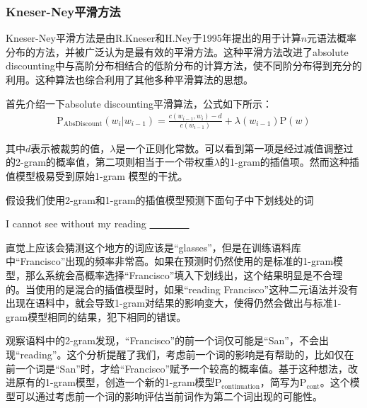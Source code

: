 
\subsubsection{Kneser-Ney平滑方法}

\parinterval Kneser-Ney平滑方法是由R.Kneser和H.Ney于1995年提出的用于计算$n$元语法概率分布的方法\cite{kneser1995improved}\cite{chen1999empirical}，并被广泛认为是最有效的平滑方法。这种平滑方法改进了absolute discounting中与高阶分布相结合的低阶分布的计算方法，使不同阶分布得到充分的利用。这种算法也综合利用了其他多种平滑算法的思想。

\parinterval 首先介绍一下absolute discounting平滑算法，公式如下所示：
\begin{eqnarray}
\textrm{P}_{\textrm{AbsDiscount}}(w_i | w_{i-1}) = \frac{c(w_{i-1},w_i )-d}{c(w_{i-1})} + \lambda(w_{i-1})\textrm{P}(w)
\label{eq:2-33}
\end{eqnarray}

\noindent 其中$d$表示被裁剪的值，$\lambda$是一个正则化常数。可以看到第一项是经过减值调整过的2-gram的概率值，第二项则相当于一个带权重$\lambda$的1-gram的插值项。然而这种插值模型极易受到原始1-gram 模型的干扰。

\parinterval 假设我们使用2-gram和1-gram的插值模型预测下面句子中下划线处的词

\vspace{0.0em}
\begin{center}
I cannot see without my reading \underline{\ \ \ \ \ \ \ \ }
\end{center}
\vspace{0.0em}

\noindent 直觉上应该会猜测这个地方的词应该是``glasses''，但是在训练语料库中``Francisco''出现的频率非常高。如果在预测时仍然使用的是标准的1-gram模型，那么系统会高概率选择``Francisco''填入下划线出，这个结果明显是不合理的。当使用的是混合的插值模型时，如果``reading Francisco''这种二元语法并没有出现在语料中，就会导致1-gram对结果的影响变大，使得仍然会做出与标准1-gram模型相同的结果，犯下相同的错误。

\parinterval 观察语料中的2-gram发现，``Francisco''的前一个词仅可能是``San''，不会出现``reading''。这个分析提醒了我们，考虑前一个词的影响是有帮助的，比如仅在前一个词是``San''时，才给``Francisco''赋予一个较高的概率值。基于这种想法，改进原有的1-gram模型，创造一个新的1-gram模型$\textrm{P}_{\textrm{continuation}}$，简写为$\textrm{P}_{\textrm{cont}}$。这个模型可以通过考虑前一个词的影响评估当前词作为第二个词出现的可能性。

